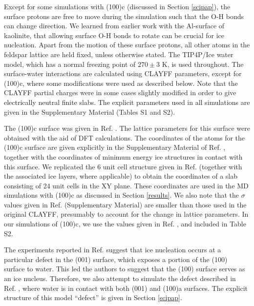 \documentclass[preprint,aps,prb,floatfix]{revtex4-1}
\begin{document}
Except for some simulations with (100)c (discussed in Section \ref{scipap}), the surface protons are free to move during the simulation such that the O-H bonds can change direction. We learned from earlier work with the Al-surface of kaolinite,\cite{ZBP15b} that allowing surface O-H bonds to rotate can be  crucial for ice nucleation. Apart from the motion of these surface protons, all other atoms in the feldspar lattice are held fixed, unless otherwise stated. The TIP4P/Ice water model,\cite{ASFV05} which has a normal freezing point of $270 \pm 3$ K,\cite{FAV06} is used throughout. The surface-water interactions are calculated using CLAYFF parameters,\cite{CLK04} except for (100)c, where some modifications were used as described below. Note that the CLAYFF partial charges were in some cases slightly modified in order to give electrically neutral finite slabs. The explicit parameters used in all simulations are given in the Supplementary Material (Tables S1 and S2). 

The (100)c surface was given in Ref. . The lattice parameters for this surface were obtained with the aid of DFT calculations. The coordinates of the atoms for the (100)c surface  are given explicitly in the Supplementary Material of Ref. , together with the coordinates of minimum energy ice structures in contact with this surface. We replicated the 6 unit cell structure given in Ref.  (together with the associated ice layers, where applicable) to obtain the coordinates of a slab consisting of 24 unit cells in the XY plane. These coordinates are used in the MD simulations with (100)c as discussed in Section \ref{results}. We also note that the $\sigma$ values given in Ref.  (Supplementary Material) are smaller than those used in the original CLAYFF, presumably to account for the change in lattice parameters. In our simulations of (100)c, we use the values given in Ref. , and included in Table S2. 

The experiments reported in Ref.  suggest that ice nucleation occurs at a particular defect in the (001) surface, which exposes a portion of the (100) surface to water. This led the authors to suggest that the (100) surface serves as an ice nucleus. Therefore, we also attempt to simulate the defect described in Ref. , where water is in contact with both (001) and (100)a surfaces. The explicit structure of this model ``defect'' is given in Section \ref{scipap}.    
\end{document}
